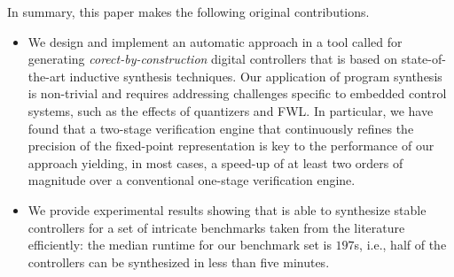 \documentclass{sig-alternate-05-2015}
\begin{document}
In summary, this paper makes the following original contributions.
%
\begin{itemize}

\item We design and implement an automatic approach in a tool called \tool  
  for generating {\em corect-by-construction} digital controllers that is based on
  state-of-the-art inductive synthesis techniques.  Our application of
  program synthesis is non-trivial and requires addressing challenges
  specific to embedded control systems, such as the effects of quantizers and
  FWL. In particular, we have found that a two-stage verification engine
  that continuously refines the precision of the fixed-point
  representation is key to the performance of our approach yielding,
  in most cases, a speed-up of at least two orders of magnitude over a
  conventional one-stage verification engine.

\item We provide experimental results showing that \tool
is able to synthesize stable controllers for a set of intricate benchmarks 
taken from the literature efficiently: the median runtime for our benchmark 
set is $197$s, i.e., half of the controllers can be synthesized in less than 
five minutes.




\end{itemize}


\end{document}
